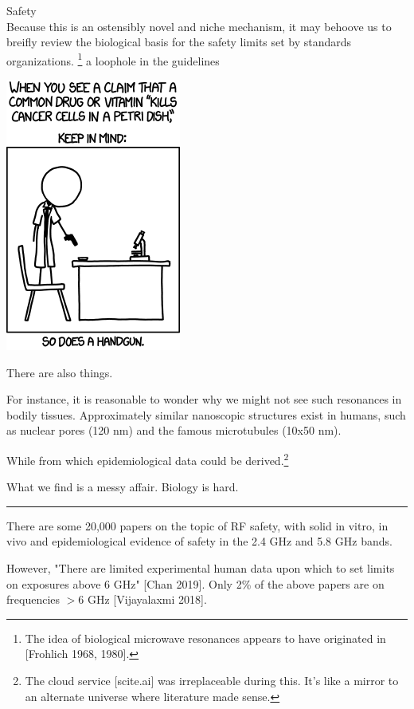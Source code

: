 \documentclass[paper.tex]{subfiles}
\begin{document}
\clearpage
\begin{multicols}{1}
{\Large Safety}\\



Because this is an ostensibly novel and niche mechanism, it may behoove us to breifly review the biological basis for the safety limits set by standards organizations. \footnote{The idea of biological microwave resonances appears to have originated in [Frohlich 1968, 1980].} a loophole in the guidelines


\includegraphics[scale=0.5]{cells.png}


There are also things.

For instance, it is reasonable to wonder why we might not see such resonances in bodily tissues. Approximately similar nanoscopic structures exist in humans, such as nuclear pores (120 nm) and the famous microtubules (10x50 nm). 

While from which epidemiological data could be derived.\footnote{The cloud service [scite.ai] was irreplaceable during this. It's like a mirror to an alternate universe where literature made sense.}

What we find is a messy affair. Biology is hard.

\rule{\linewidth}{0.2pt}

There are some 20,000 papers on the topic of RF safety, with solid in vitro, in vivo and epidemiological evidence of safety in the 2.4 GHz and 5.8 GHz bands.

However, "There are limited experimental human data upon which to set limits on exposures above 6 GHz" [Chan 2019]. Only 2\% of the above papers are on frequencies $>6$ GHz [Vijayalaxmi 2018]. 


\end{multicols}
\end{document}
